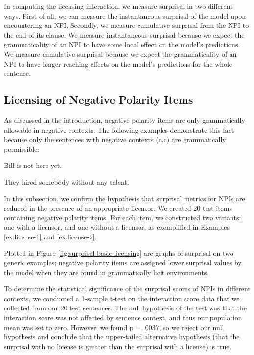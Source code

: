 \documentclass[11pt, round]{article}
\begin{document}
In computing the licensing interaction, we measure surprisal in two different ways. First of all, we can measure the instantaneous surprisal of the model upon encountering an NPI. Secondly, we measure cumulative surprisal from the NPI to the end of its clause. We measure instantaneous surprisal because we expect the grammaticality of an NPI to have some local effect on the model's predictions. We measure cumulative surprisal because we expect the grammaticality of an NPI to have longer-reaching effects on the model's predictions for the whole sentence.

\subsection{Licensing of Negative Polarity Items}

As discussed in the introduction, negative polarity items are only grammatically allowable in negative contexts. The following examples demonstrate this fact because only the sentences with negative contexts (a,c) are grammatically permissible:
\begin{exe}
\ex\label{ex:license-1}
\begin{xlist}
\ex Bill is not here yet.
\end{xlist}
\ex\label{ex:license-2}
\begin{xlist}
\ex They hired somebody without any talent.
\end{xlist}
\end{exe}
In this subsection, we confirm the hypothesis that surprisal metrics for NPIs are reduced in the presence of an appropriate licensor. We created 20 test items containing negative polarity items. For each item, we constructed two variants: one with a licensor, and one without a licensor, as exemplified in Examples \ref{ex:license-1} and \ref{ex:license-2}.

Plotted in Figure \ref{fig:surprisal-basic-licensing} are graphs of surprisal on two generic examples; negative polarity items are assigned lower surprisal values by the model when they are found in grammatically licit environments. 

To determine the statistical significance of the surprisal scores of NPIs in different contexts, we conducted a 1-sample t-test on the interaction score data that we collected from our 20 test sentences. The null hypothesis of the test was that the interaction score was not affected by sentence context, and thus our population mean was set to zero. However, we found p = .0037, so we reject our null hypothesis and conclude that the upper-tailed alternative hypothesis (that the surprisal with no license is greater than the surprisal with a license) is true.
\end{document}
